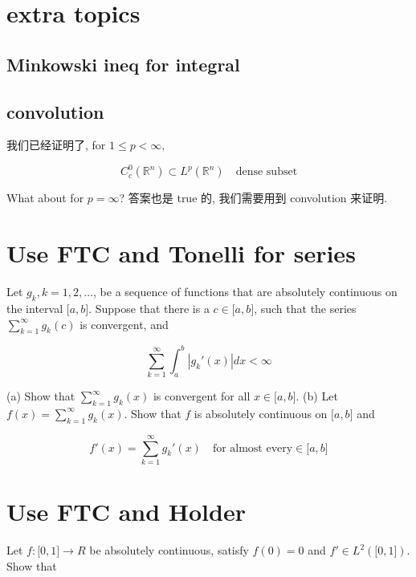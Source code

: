 \documentclass{qlnotes-export}
\begin{document}
\chapter{extra topics}\label{extra-topics}

\section{Minkowski ineq for integral}\label{minkowski-ineq-for-integral}

\section{convolution}\label{convolution}

我们已经证明了, for \(1 \leq p < \infty\),

\[C_{c}^{0}({\mathbb{R}}^{n}) \subset L^{p}({\mathbb{R}}^{n})\quad\text{dense subset}\]

What about for \(p = \infty\)? 答案也是 true 的, 我们需要用到 convolution 来证明.\\

\chapter{Use FTC and Tonelli for series}\label{use-ftc-and-tonelli-for-series}

Let \(g_{k},k = 1,2,\ldots\), be a sequence of functions that are absolutely continuous on the interval \(\lbrack a,b\rbrack\). Suppose that there is a \(c \in \lbrack a,b\rbrack\), such that the series \(\sum_{k = 1}^{\infty}g_{k}(c)\) is convergent, and

\[\sum\limits_{k = 1}^{\infty}\int_{a}^{b}\left| {g_{k}'(x)} \right|dx < \infty\]

(a) Show that \(\sum_{k = 1}^{\infty}g_{k}(x)\) is convergent for all \(x \in \lbrack a,b\rbrack\). (b) Let \(f(x) = \sum_{k = 1}^{\infty}g_{k}(x)\). Show that \(f\) is absolutely continuous on \(\lbrack a,b\rbrack\) and

\[f'(x) = \sum\limits_{k = 1}^{\infty}g_{k}'(x)\quad\text{for almost every} \in \lbrack a,b\rbrack\]



\chapter{Use FTC and Holder}\label{use-ftc-and-holder}

Let \(f:\lbrack 0,1\rbrack\rightarrow R\) be absolutely continuous, satisfy \(f(0) = 0\) and \(f' \in L^{2}(\lbrack 0,1\rbrack)\). Show that
\end{document}
